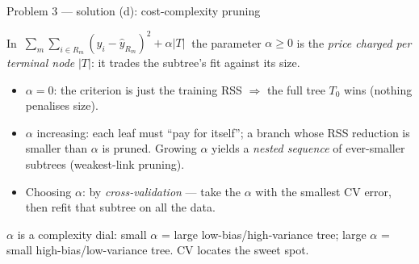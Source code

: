 \documentclass[aspectratio=169,11pt]{beamer}
\begin{document}
\begin{frame}{Problem 3 --- solution (d): cost-complexity pruning}
  \begin{solutionbox}
    In $\ \sum_{m}\sum_{i\in R_m}(y_i-\hat y_{R_m})^2+\alpha|T|\ $ the parameter $\alpha\ge0$ is the
    \emph{price charged per terminal node} $|T|$: it trades the subtree's fit against its size.
    \begin{itemize}
      \item $\alpha=0$: the criterion is just the training RSS $\Rightarrow$ the full tree $T_0$
        wins (nothing penalises size).
      \item $\alpha$ increasing: each leaf must ``pay for itself''; a branch whose RSS reduction is
        smaller than $\alpha$ is pruned. Growing $\alpha$ yields a \emph{nested sequence} of
        ever-smaller subtrees (weakest-link pruning).
      \item Choosing $\alpha$: by \emph{cross-validation} --- take the $\alpha$ with the smallest
        CV error, then refit that subtree on all the data.
    \end{itemize}
  \end{solutionbox}
  \begin{takeaway}
    \footnotesize $\alpha$ is a complexity dial: small $\alpha$ = large low-bias/high-variance
    tree; large $\alpha$ = small high-bias/low-variance tree. CV locates the sweet spot.
  \end{takeaway}
\end{frame}
\end{document}
